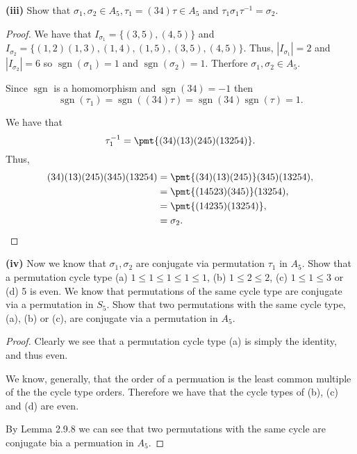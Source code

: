 \documentclass{article}
\DeclareMathOperator*{\sgn}{sgn}
\newenvironment{hwproof}[1]
{
    #1
    \begin{proof}
}{
    \end{proof}
}
\begin{document}
\begin{hwproof}
    {
        \textbf{(iii)} Show that $\sigma_1, \sigma_2 \in A_5, \tau_1 = (34)\tau \in A_5$ and
        $\tau_1 \sigma_1 \tau^{-1} = \sigma_2$.
    }
    We have that $I_{\sigma_1} = \{(3,5),(4,5)\}$ and
    $I_{\sigma_2} = \{(1,2)(1,3),(1,4),(1,5), (3,5),(4,5)\}$. Thus,
    $| I_{\sigma_1} | = 2$ and $| I_{\sigma_2} | = 6$ so $\sgn(\sigma_1) = 1$
    and $\sgn(\sigma_2) = 1$. Therfore $\sigma_1, \sigma_2 \in A_5$.

    Since $\sgn$ is a homomorphism and $\sgn(34) = -1$ then
    \begin{equation*}
        \sgn(\tau_1) = \sgn((34)\tau) = \sgn(34)\sgn(\tau) = 1.
    \end{equation*}

    We have that
    \begin{equation*}
        \tau_1^{-1} = \pmt{(34)(13)(245)(13254)}.
    \end{equation*}
    Thus,
    \begin{align*}
        (34)(13)(245)(345)(13254) & = \pmt{(34)(13)(245)}(345)(13254), \\
                                  & = \pmt{(14523)(345)}(13254),       \\
                                  & = \pmt{(14235)(13254)},            \\
                                  & = \sigma_2.
    \end{align*}
\end{hwproof}

\begin{hwproof}
    {
        \textbf{(iv)} Now we know that $\sigma_1, \sigma_2$ are conjugate via
        permutation $\tau_1$ in $A_5$. Show that a permutation cycle type
        (a) $1 \leq 1 \leq 1 \leq 1 \leq 1$,
        (b) $1 \leq 2 \leq 2$, (c) $1 \leq 1 \leq 3$ or (d) 5 is even. We know that
        permutations of the same cycle type are conjugate via a permutation
        in $S_5$. Show that two permutations with the same cycle type, (a), (b)
        or (c), are conjugate via a permutation in $A_5$.
    }
    Clearly we see that a permutation cycle type (a) is simply the identity, and
    thus even.

    We know, generally, that the order of a permuation is the least common
    multiple of the the cycle type orders. Therefore we have that the cycle types
    of (b), (c) and (d) are even.

    By Lemma 2.9.8 we can see that two permutations with the same cycle are
    conjugate bia a permuation in $A_5$.


\end{hwproof}
\end{document}
